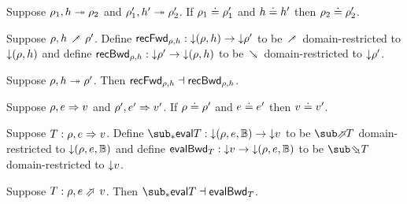 \begin{lemma}
    Suppose $\rho_1, h \mathrel{\twoheadrightarrow} \rho_2$ and $\rho_1', h' \mathrel{\twoheadrightarrow} \rho_2'$. If $\rho_1 \doteq \rho_1'$ and $h \doteq h'$ then $\rho_2 \doteq \rho_2'$.
\end{lemma}

\begin{definition}
   Suppose $\rho, h \closeDefsFwdR \rho'$. Define $\mathsf{recFwd}_{\rho,h}: {\downarrow}{(\rho, h)} \to {\downarrow}{\rho'}$ to be $\closeDefsFwdR$ domain-restricted to ${\downarrow}{(\rho, h)}$ and define $\mathsf{recBwd}_{\rho,h}: {\downarrow}{\rho'} \to {\downarrow}{(\rho, h)}$ to be $\closeDefsBwdR$ domain-restricted to ${\downarrow}{\rho'}$.
\end{definition}

\begin{theorem}
\label{thm:core-language:closeDefs:gc}
   Suppose $\rho, h \mathrel{\twoheadrightarrow} \rho'$.  Then $\mathsf{recFwd}_{\rho,h} \dashv \mathsf{recBwd}_{\rho,h}$.
\end{theorem}

\begin{lemma}
   Suppose $\rho, e \mathrel{\Rightarrow} v$ and $\rho', e' \mathrel{\Rightarrow} v'$. If $\rho \doteq \rho'$ and $e \doteq e'$ then $v \doteq v'$.
\end{lemma}

\begin{definition}
   Suppose $T: \rho, e \mathrel{\Rightarrow} v$. Define $\evalFwdF{T}: \Below{(\rho, e, \Bool)} \to \Below{v}$ to be $\evalFwdR{T}$ domain-restricted to ${\downarrow}{(\rho, e, \mathbb{B})}$ and define $\mathsf{evalBwd}_{T}: {\downarrow}{v} \to {\downarrow}{(\rho, e, \mathbb{B})}$ to be $\evalBwdR{T}$ domain-restricted to ${\downarrow}{v}$.
\end{definition}

\begin{theorem}
\label{thm:core-language:eval:gc}
   Suppose $T: \rho, e \evalFwdS v$.  Then $\evalFwdF{T} \adjoint \evalBwdF{T}$.
\end{theorem}
